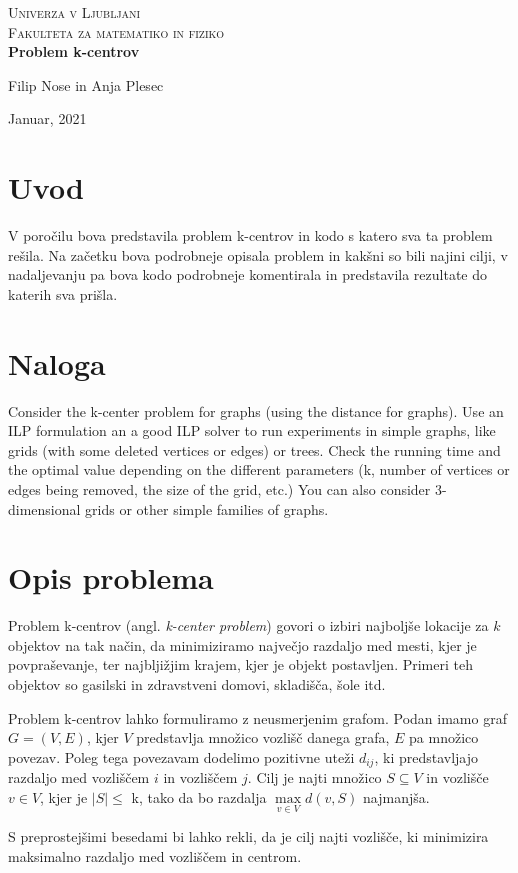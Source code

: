 \documentclass[a4paper]{article}
\begin{document}
\begin{titlepage}
\center
\textsc{\LARGE Univerza v Ljubljani}\\[0.5cm]
\textsc{\Large Fakulteta za matematiko in fiziko}\\[0.5cm]

{\huge\bfseries Problem k-centrov}\\[0.4cm]


\vfill\vfill\vfill

{ Filip Nose in Anja Plesec}

{ Januar, 2021}

\vfill

\end{titlepage}

\tableofcontents

\newpage

\section{Uvod}
V poročilu bova predstavila problem k-centrov in kodo s katero sva ta problem rešila. Na začetku bova podrobneje opisala problem in kakšni so bili najini cilji, v nadaljevanju pa bova kodo podrobneje komentirala in predstavila rezultate do katerih sva prišla.

\section{Naloga}
Consider the k-center problem for graphs (using the distance for graphs). Use an ILP formulation an a good ILP solver to run experiments in simple graphs, like grids (with some deleted vertices or edges) or trees. Check the running time and the optimal value depending on the different parameters (k, number of vertices or edges being removed, the size of the grid, etc.) You can also consider 3-dimensional grids or other simple families of graphs.

\section{Opis problema}

Problem k-centrov (angl. \textit{k-center problem}) govori o izbiri najboljše lokacije za $k$ objektov na tak način, da minimiziramo največjo razdaljo med mesti, kjer je povpraševanje, ter najbljižjim krajem, kjer je objekt postavljen. Primeri teh objektov so gasilski in zdravstveni domovi, skladišča, šole itd.
\par
Problem k-centrov lahko formuliramo z neusmerjenim grafom. Podan imamo graf $G = (V, E)$, kjer $V$ predstavlja množico vozlišč danega grafa, $E$ pa množico povezav. Poleg tega povezavam dodelimo pozitivne uteži $d_{ij}$, ki predstavljajo razdaljo med vozliščem $i$ in vozliščem $j$. Cilj je najti množico $S \subseteq V$  in vozlišče $v \in V$, kjer je $|S|\leq$ k, tako da bo razdalja $\max\limits_{v \in V} d(v, S)$ najmanjša.
\par
 S preprostejšimi besedami bi lahko rekli, da je cilj najti vozlišče, ki minimizira maksimalno razdaljo med vozliščem in centrom.
\end{document}
